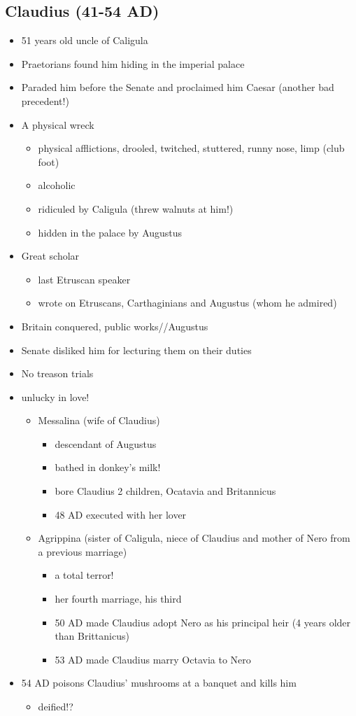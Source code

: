 \documentclass[12pt, twoside]{article}
\begin{document}
\subsection{Claudius (41-54 AD)}
\begin{itemize}
\item 51 years old uncle of Caligula
\item Praetorians found him hiding in the imperial palace
\item Paraded him before the Senate and proclaimed him Caesar (another bad precedent!)
\item A physical wreck
	\begin{itemize}
	\item physical afflictions, drooled, twitched, stuttered, runny nose, limp (club foot)
	\item alcoholic
	\item ridiculed by Caligula (threw walnuts at him!)
	\item hidden in the palace by Augustus
	\end{itemize}
\item Great scholar
	\begin{itemize}
	\item last Etruscan speaker
	\item wrote on Etruscans, Carthaginians and Augustus (whom he admired)
	\end{itemize}
\item Britain conquered, public works//Augustus
\item Senate disliked him for lecturing them on their duties
\item No treason trials
\item unlucky in love!
	\begin{itemize}
	\item Messalina (wife of Claudius)
		\begin{itemize}
		\item descendant of Augustus
		\item bathed in donkey’s milk!
		\item bore Claudius 2 children, Ocatavia and Britannicus
		\item 48 AD executed with her lover
		\end{itemize}
	\item Agrippina (sister of Caligula, niece of Claudius and mother of Nero from a previous marriage)
		\begin{itemize}
		\item a total terror!
		\item her fourth marriage, his third
		\item 50 AD made Claudius adopt Nero as his principal heir (4 years older than Brittanicus)
		\item 53 AD made Claudius marry Octavia to Nero
		\end{itemize}
	\end{itemize}
\item 54 AD poisons Claudius’ mushrooms at a banquet and kills him
	\begin{itemize}
	\item deified!?
	\end{itemize}
\end{itemize}
\end{document}
